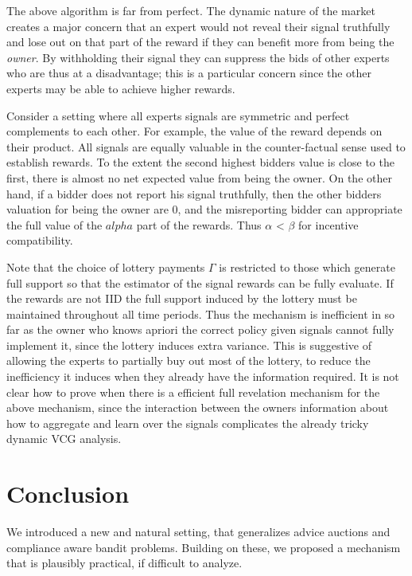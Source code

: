 The above algorithm is far from perfect.
The dynamic nature of the market creates a major concern that an expert would not reveal their signal truthfully and lose out on that part of the reward if they can benefit more from being the \emph{owner}.
By withholding their signal they can suppress the bids of other experts who are thus at a disadvantage; this is a particular concern since the other experts may be able to achieve higher rewards.

Consider a setting where all experts signals are symmetric and perfect complements to each other.
For example, the value of the reward depends on their product.
All signals are equally valuable in the counter-factual sense used to establish rewards.
To the extent the second highest bidders value is close to the first, there is almost no net expected value from being the owner.
On the other hand, if a bidder does not report his signal truthfully, then the other bidders valuation for being the owner are 0, and the misreporting bidder can appropriate the full value of the $alpha$ part of the rewards.
Thus $\alpha$ < $\beta$ for incentive compatibility. 

Note that the choice of lottery payments $\Gamma$ is restricted to those which generate full support so that the estimator of the signal rewards can be fully evaluate. 
If the rewards are not IID the full support induced by the lottery must be maintained throughout all time periods. 
Thus the mechanism is inefficient in so far as the owner who knows apriori the correct policy given signals cannot fully implement it, since the lottery induces extra variance.
This is suggestive of allowing the experts to partially buy out most of the lottery, to reduce the inefficiency it induces when they already have the information required. 
It is not clear how to prove when there is a efficient full revelation mechanism for the above mechanism, since the interaction between the owners information about how to aggregate and learn over the signals complicates the already tricky dynamic VCG analysis. 


\section{Conclusion}

We introduced a new and natural setting, that generalizes advice auctions and compliance aware bandit problems.
Building on these, we proposed a mechanism that is plausibly practical, if difficult to analyze.




